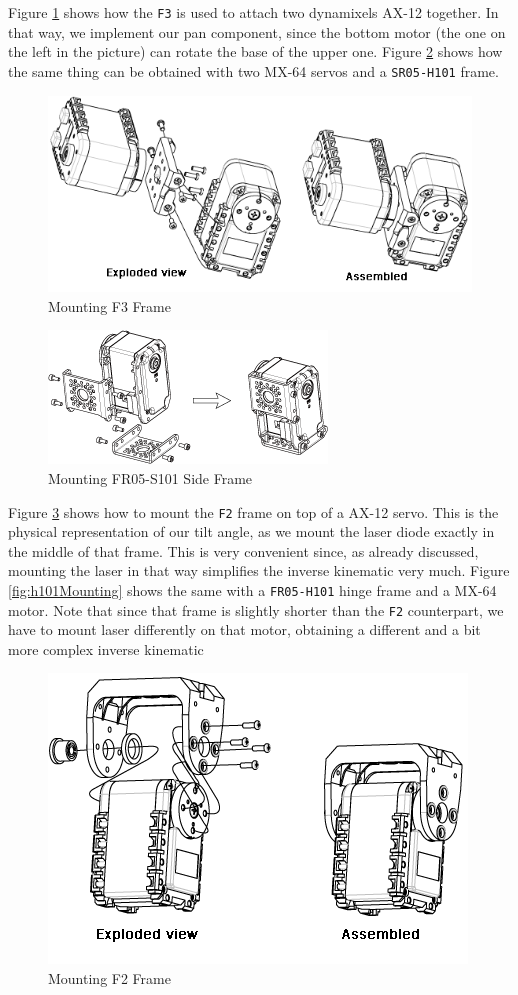 Figure \ref{fig:axMounting2} shows how the \texttt{F3} is used to attach two dynamixels AX-12 together. In that way, we implement our pan component, since the bottom motor (the one on the left in the picture) can rotate the base of the upper one. Figure \ref{fig:s101Mounting} shows how the same thing can be obtained with two MX-64 servos and a \texttt{SR05-H101} frame.
\begin{figure}
	\centering
	\includegraphics[width=.7\textwidth]{img/axMounting2.png}%
	\caption{Mounting F3 Frame}
	\label{fig:axMounting2}
\end{figure}
\begin{figure}
	\centering
	\includegraphics[width=.7\textwidth]{img/rx-64_fr05-s101.png}%
	\caption{Mounting FR05-S101 Side Frame}
	\label{fig:s101Mounting}
\end{figure}

Figure \ref{fig:axMounting1} shows how to mount the \texttt{F2} frame on top of a AX-12 servo. This is the physical representation of our tilt angle, as we mount the laser diode exactly in the middle of that frame. This is very convenient since, as already discussed, mounting the laser in that way simplifies the inverse kinematic very much. Figure \ref{fig:h101Mounting} shows the same with a \texttt{FR05-H101} hinge frame and a MX-64 motor. Note that since that frame is slightly shorter than the \texttt{F2} counterpart, we have to mount laser differently on that motor, obtaining a different and a bit more complex inverse kinematic
\begin{figure}
	\centering
	\includegraphics[width=.7\textwidth]{img/axMounting1.png}%
	\caption{Mounting F2 Frame}
	\label{fig:axMounting1}
\end{figure}


